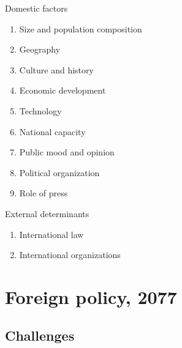\documentclass[
  openany]{book}
\providecommand{\tightlist}{%
  \setlength{\itemsep}{0pt}\setlength{\parskip}{0pt}}
\begin{document}
Domestic factors

\begin{enumerate}
\def\labelenumi{\arabic{enumi}.}
\tightlist
\item
  Size and population composition
\item
  Geography
\item
  Culture and history
\item
  Economic development
\item
  Technology
\item
  National capacity
\item
  Public mood and opinion
\item
  Political organization
\item
  Role of press
\end{enumerate}

External determinants

\begin{enumerate}
\def\labelenumi{\arabic{enumi}.}
\tightlist
\item
  International law
\item
  International organizations
\end{enumerate}

\hypertarget{foreign-policy-2077}{%
\section{Foreign policy, 2077}\label{foreign-policy-2077}}

\hypertarget{challenges}{%
\subsection{Challenges}\label{challenges}}
\end{document}
